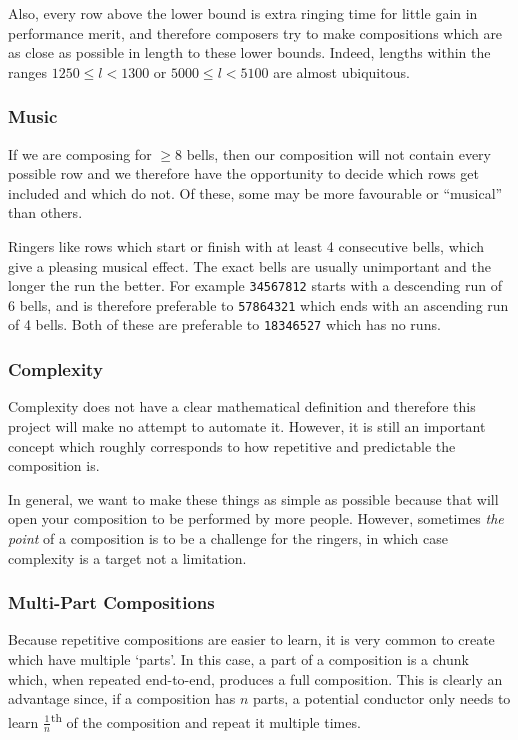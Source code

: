 \documentclass[12pt]{article}
\newcommand{\row}[1]{\texttt{#1}}
\newcommand{\nth}[2]{#1\textsuperscript{#2}}
\begin{document}
Also, every row above the lower bound is extra ringing time for little gain in performance merit,
and therefore composers try to make compositions which are as close as possible in length to these
lower bounds.  Indeed, lengths within the ranges $1250 \le l < 1300$ or $5000 \le l < 5100$ are
almost ubiquitous.

\subsubsection{Music}

If we are composing for $\ge 8$ bells, then our composition will not contain every possible row and
we therefore have the opportunity to decide which rows get included and which do not.  Of these, some
may be more favourable or ``musical'' than others.

Ringers like rows which start or finish with at least 4 consecutive bells, which give a pleasing
musical effect.  The exact bells are usually unimportant and the longer the run the better.  For
example \row{34567812} starts with a descending run of 6 bells, and is therefore preferable to
\row{57864321} which ends with an ascending run of 4 bells.  Both of these are preferable to
\row{18346527} which has no runs.

\subsubsection{Complexity}

Complexity does not have a clear mathematical definition and therefore this project will make no
attempt to automate it.  However, it is still an important concept which roughly corresponds to how
repetitive and predictable the composition is.

In general, we want to make these things as simple as possible because that will open your
composition to be performed by more people.  However, sometimes \emph{the point} of a composition is
to be a challenge for the ringers, in which case complexity is a target not a limitation.

\subsubsection{Multi-Part Compositions}

Because repetitive compositions are easier to learn, it is very common to create which have multiple
`parts'.  In this case, a part of a composition is a chunk which, when repeated end-to-end, produces
a full composition.  This is clearly an advantage since, if a composition has $n$ parts, a potential
conductor only needs to learn \nth{$\frac{1}{n}$}{th} of the composition and repeat it multiple
times.
\end{document}
